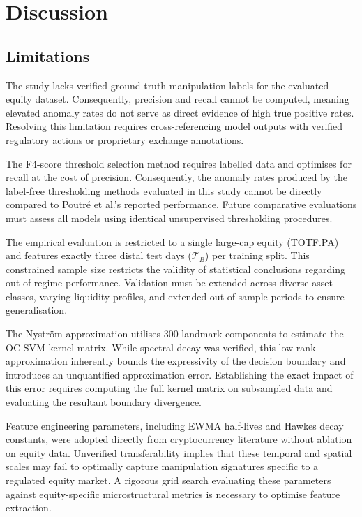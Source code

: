 \documentclass[11pt]{report}
\begin{document}
\chapter{Discussion}\label{chap:discussion}

\section{Limitations}\label{sec:discussion:limitations}

The study lacks verified ground-truth manipulation labels for the evaluated equity dataset. Consequently, precision and recall cannot be computed, meaning elevated anomaly rates do not serve as direct evidence of high true positive rates. Resolving this limitation requires cross-referencing model outputs with verified regulatory actions or proprietary exchange annotations.

The F4-score threshold selection method requires labelled data and optimises for recall at the cost of precision. Consequently, the anomaly rates produced by the label-free thresholding methods evaluated in this study cannot be directly compared to Poutré et al.'s reported performance. Future comparative evaluations must assess all models using identical unsupervised thresholding procedures.

The empirical evaluation is restricted to a single large-cap equity (TOTF.PA) and features exactly three distal test days ($\mathcal{T}_B$) per training split. This constrained sample size restricts the validity of statistical conclusions regarding out-of-regime performance. Validation must be extended across diverse asset classes, varying liquidity profiles, and extended out-of-sample periods to ensure generalisation.

The Nyström approximation utilises 300 landmark components to estimate the OC-SVM kernel matrix. While spectral decay was verified, this low-rank approximation inherently bounds the expressivity of the decision boundary and introduces an unquantified approximation error. Establishing the exact impact of this error requires computing the full kernel matrix on subsampled data and evaluating the resultant boundary divergence.

Feature engineering parameters, including EWMA half-lives and Hawkes decay constants, were adopted directly from cryptocurrency literature without ablation on equity data. Unverified transferability implies that these temporal and spatial scales may fail to optimally capture manipulation signatures specific to a regulated equity market. A rigorous grid search evaluating these parameters against equity-specific microstructural metrics is necessary to optimise feature extraction.
\end{document}
